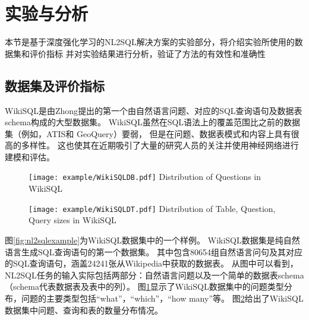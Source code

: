 \section{实验与分析}
本节是基于深度强化学习的NL2SQL解决方案的实验部分，将介绍实验所使用的数据集和评价指标
并对实验结果进行分析，验证了方法的有效性和准确性

\subsection{数据集及评价指标}
WikiSQL是由Zhong\cite{zhong2017seq2sql}提出的第一个由自然语言问题、对应的SQL查询语句及数据表schema构成的大型数据集。
WikiSQL虽然在SQL语法上的覆盖范围比之前的数据集（例如，ATIS\cite{price1990evaluation,Dahl1994Expanding}和 GeoQuery\cite{Zelle2008Learning}）要弱，
但是在问题、数据表模式和内容上具有很高的多样性。
这也使其在近期吸引了大量的研究人员的关注并使用神经网络进行建模和评估\cite{zhong2017seq2sql,dong2016language,xu2017sqlnet,yu2018typesql,wang2018pointing,huang2018natural,wang2018execution}。


\begin{figure}[!htp]
  \centering
  \texttt{[image: example/WikiSQLDB.pdf]}
    {Distribution of Questions in WikiSQL}
  \label{fig:WikiSQLDB}
\end{figure}

\begin{figure}[!htp]
  \centering
  \texttt{[image: example/WikiSQLDT.pdf]}
    {Distribution of Table, Question, Query sizes in WikiSQL}
  \label{fig:WikiSQLDT}
\end{figure}

图\ref{fig:nl2sqlexample}为WikiSQL数据集\cite{zhong2017seq2sql}中的一个样例。
WikiSQL数据集是纯自然语言生成SQL查询语句的第一个数据集。
其中包含80654组自然语言问句及其对应的SQL查询语句，涵盖24241张从Wikipedia中获取的数据表。
从图中可以看到，NL2SQL任务的输入实际包括两部分：自然语言问题以及一个简单的数据表schema（schema代表数据表及表中的列）。
图\ref{fig:WikiSQLDB}显示了WikiSQL数据集中的问题类型分布，问题的主要类型包括“what”，“which”，“how many”等。
图\ref{fig:WikiSQLDT}给出了WikiSQL数据集中问题、查询和表的数量分布情况。

